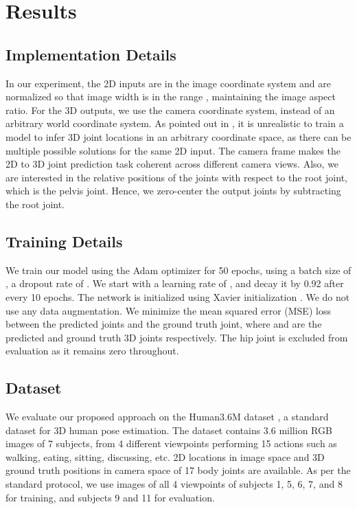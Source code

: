 \documentclass{article}
\begin{document}
\section{Results}

\subsection{Implementation Details}
In our experiment, the 2D inputs are in the image coordinate system and are normalized so that image width is in the range , maintaining the image aspect ratio.
For the 3D outputs, we use the camera coordinate system, instead of an arbitrary world coordinate system.
As pointed out in \cite{Martinez2017,Cai2019,Zhao2019}, it is unrealistic to train a model to infer 3D joint locations in an arbitrary coordinate space, as there can be multiple possible solutions for the same 2D input.
The camera frame makes the 2D to 3D joint prediction task coherent across different camera views.
Also, we are interested in the relative positions of the joints with respect to the root joint, which is the pelvis joint.
Hence, we zero-center the output joints by subtracting the root joint.

\subsection{Training Details}
We train our model using the Adam optimizer \cite{KingmaB14} for 50 epochs, using a batch size of , a dropout rate of  .
We start with a learning rate of , and decay it by 0.92 after every 10 epochs.
The network is initialized using Xavier initialization \cite{glorot2010understanding}. 
We do not use any data augmentation.
We minimize the mean squared error (MSE) loss between the predicted joints and the ground truth joint,  where  and  are the predicted and ground truth 3D joints respectively.
The hip joint is excluded from evaluation as it remains zero throughout.

\subsection{Dataset}
We evaluate our proposed approach on the Human3.6M dataset \cite{ionescu2013human3}, a standard dataset for 3D human pose estimation.
The dataset contains 3.6 million RGB images of 7 subjects, from 4 different viewpoints performing 15 actions such as walking, eating, sitting, discussing, etc.
2D locations in image space and 3D ground truth positions in camera space of 17 body joints are available.
As per the standard protocol, we use images of all 4 viewpoints of subjects 1, 5, 6, 7, and 8 for training, and subjects 9 and 11 for evaluation.
\end{document}
